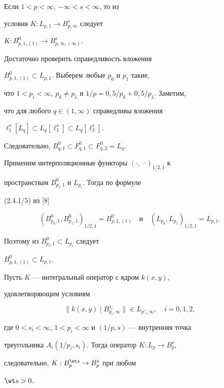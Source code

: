 \begin{lem}


Если $1<p<\infty$, $-\infty <s<\infty$, то из


условия $K:L_{p,1} \rightarrow B^s_{p,\infty }$ следует


$K:B^0_{p,1,(1)} \rightarrow B^s_{p,\infty,(\infty )}$.


\end{lem}





\begin{pf}


Достаточно проверить справедливость вложения


$B^0_{p,1,(1)} \subset L_{p,1}$. Выберем любые $p_0$ и $p_1$ такие,


что $1<p_i<\infty$, $p_0 \ne p_1$ и $1/p=0,5/p_0 +0,5/p_1$. Заметим,


что для любого $q \in (1,\infty)$ справедливы вложения


$\ell^s_1[L_q] \subset L_q[\ell^s_1]\subset L_q[\ell^s_2]$.


Следовательно, $B^0_{q,1} \subset F^0_{q,1} \subset F^0_{q,2} = L_q$.


Применим интерполяционные функторы $(\cdot,\, \cdot )_{1/2,1}$ к


пространствам $B^0_{p_i,1}$ и $L_{p_i}$. Тогда по формуле


(2.4.1/5) из [8]


$$


(B^0_{p_0,1}, B^0_{p_1,1})_{1/2,1}=B^0_{p,1,(1)} \quad \text{и} \quad


(L_{p_0},L_{p_1} )_{1/2,1} =L_{p,1}.


$$


Поэтому из $B^0_{p_i,1} \subset L_{p_i}$ следует


$B^0_{p,1,(1)}\subset L_{p,1}$.


\end{pf}





\begin{thm}


Пусть $K$ --- интегральный оператор с ядром $k(x,y)$,


удовлетворяющим условиям


$$


\| k(x,y)\mid B^{s_i}_{p_i,\infty }\| \in L_{p'_i,\infty }, \quad


i=0,1,2,


$$


где $0<s_i<\infty$, $1<p_i<\infty$ и $(1/p,s)$ --- внутренняя точка


треугольника $A_i(1/p_i,s_i)$. Тогда оператор $K:L_p\rightarrow B^s_p$,


следовательно, $K:B^{\wt s}_p \rightarrow B^s_p$ при любом


$\wt s >0$.


\end{thm}





